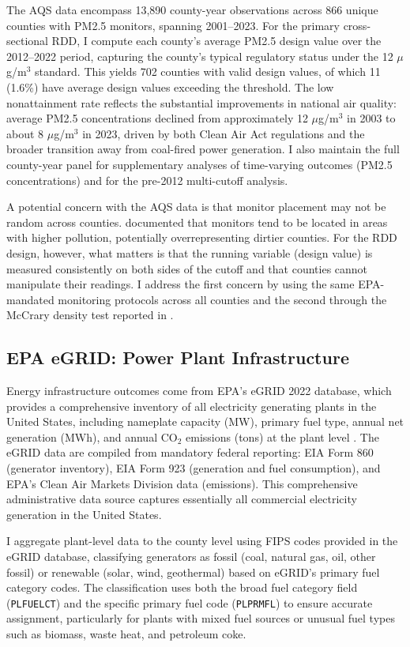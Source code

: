 \documentclass[12pt]{article}
\begin{document}
The AQS data encompass 13,890 county-year observations across 866 unique counties with PM2.5 monitors, spanning 2001--2023. For the primary cross-sectional RDD, I compute each county's average PM2.5 design value over the 2012--2022 period, capturing the county's typical regulatory status under the 12 $\mu$g/m$^3$ standard. This yields 702 counties with valid design values, of which 11 (1.6\%) have average design values exceeding the threshold. The low nonattainment rate reflects the substantial improvements in national air quality: average PM2.5 concentrations declined from approximately 12 $\mu$g/m$^3$ in 2003 to about 8 $\mu$g/m$^3$ in 2023, driven by both Clean Air Act regulations and the broader transition away from coal-fired power generation. I also maintain the full county-year panel for supplementary analyses of time-varying outcomes (PM2.5 concentrations) and for the pre-2012 multi-cutoff analysis.

A potential concern with the AQS data is that monitor placement may not be random across counties. \citet{grainger2018discrimination} documented that monitors tend to be located in areas with higher pollution, potentially overrepresenting dirtier counties. For the RDD design, however, what matters is that the running variable (design value) is measured consistently on both sides of the cutoff and that counties cannot manipulate their readings. I address the first concern by using the same EPA-mandated monitoring protocols across all counties and the second through the McCrary density test reported in .

\subsection{EPA eGRID: Power Plant Infrastructure}

Energy infrastructure outcomes come from EPA's eGRID 2022 database, which provides a comprehensive inventory of all electricity generating plants in the United States, including nameplate capacity (MW), primary fuel type, annual net generation (MWh), and annual CO$_2$ emissions (tons) at the plant level \citep{EPA2022eGRID}. The eGRID data are compiled from mandatory federal reporting: EIA Form 860 (generator inventory), EIA Form 923 (generation and fuel consumption), and EPA's Clean Air Markets Division data (emissions). This comprehensive administrative data source captures essentially all commercial electricity generation in the United States.

I aggregate plant-level data to the county level using FIPS codes provided in the eGRID database, classifying generators as fossil (coal, natural gas, oil, other fossil) or renewable (solar, wind, geothermal) based on eGRID's primary fuel category codes. The classification uses both the broad fuel category field (\texttt{PLFUELCT}) and the specific primary fuel code (\texttt{PLPRMFL}) to ensure accurate assignment, particularly for plants with mixed fuel sources or unusual fuel types such as biomass, waste heat, and petroleum coke.
\end{document}
